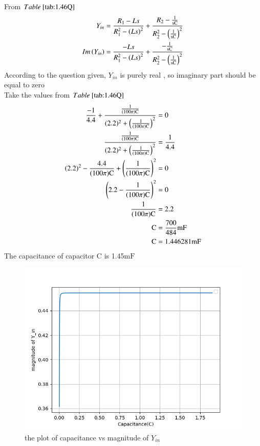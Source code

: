 \documentclass[a4,12pt,onecolumn]{IEEEtran}
\begin{document}
From $\tabref{tab:1.46Q}$
\begin{align} 
Y_{in}&=\frac{R_1-Ls}{R_1^2-\left(Ls\right)^2} + \frac{R_2-\frac{1}{ \text{sC}}}{R_2^2-\left(\frac{1}{ \text{sC}}\right)^2}\\
Im\left(Y_{in}\right)&=\frac{-Ls}{R_1^2-\left(Ls\right)^2} + \frac{-\frac{1}{ \text{sC}}}{R_2^2-\left(\frac{1}{ \text{sC}}\right)^2}
\end{align}
According to the question given, $Y_{in}$ is purely real , so imaginary part should be equal to zero\\
Take the values from $\tabref{tab:1.46Q}$\\
\begin{align}
 \frac{-1}{4.4}+\frac{\frac{1}{ (100\pi) \text{C}}}{(2.2)^2+\left(\frac{1}{ (100\pi) \text{C}}\right)^2}&=0\\ 
 \frac{\frac{1}{ (100\pi) \text{C}}}{(2.2)^2+\left(\frac{1}{ (100\pi) \text{C}}\right)^2}&=\frac{1}{4.4}\\
  (2.2)^2-\frac{4.4}{ (100\pi) \text{C}}+\left(\frac{1}{ (100\pi) \text{C}}\right)^2&=0\\
 \left(2.2-\frac{1}{ (100\pi) \text{C}}\right)^2&=0\\
 \frac{1}{ (100\pi) \text{C}}&=2.2\\
 \text{C}&=\frac{700}{484}\text{mF}\\
 \text{C}&=1.446281\text{mF}
\end{align}
The capacitance of capacitor $\text{C}$ is 1.45$\text{mF}$
\begin{figure}[ht!]
\includegraphics[width=\columnwidth]{figs/fig2.png}
\caption{\large{the plot of capacitance vs magnitude of $Y_{in}$}}
\end{figure}
\end{document}
